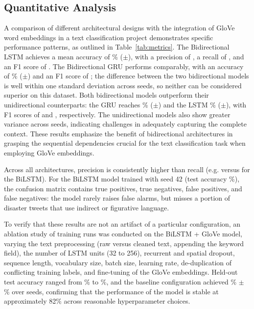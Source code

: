 \documentclass[conference]{IEEEtran}
\begin{document}
\subsection{Quantitative Analysis}
A comparison of different architectural designs with the integration of GloVe word embeddings in a text classification project demonstrates specific performance patterns, as outlined in Table~\ref{tab:metrics}. The Bidirectional LSTM achieves a mean accuracy of \accBilstm\% ($\pm$\accsdBilstm), with a precision of \precBilstm, a recall of \recBilstm, and an F1 score of \foneBilstm. The Bidirectional GRU performs comparably, with an accuracy of \accBigru\% ($\pm$\accsdBigru) and an F1 score of \foneBigru; the difference between the two bidirectional models is well within one standard deviation across seeds, so neither can be considered superior on this dataset. Both bidirectional models outperform their unidirectional counterparts: the GRU reaches \accGru\% ($\pm$\accsdGru) and the LSTM \accLstm\% ($\pm$\accsdLstm), with F1 scores of \foneGru{} and \foneLstm{}, respectively. The unidirectional models also show greater variance across seeds, indicating challenges in adequately capturing the complete context. These results emphasize the benefit of bidirectional architectures in grasping the sequential dependencies crucial for the text classification task when employing GloVe embeddings.



Across all architectures, precision is consistently higher than recall (e.g. \precBilstm{} versus \recBilstm{} for the BiLSTM). For the BiLSTM model trained with seed 42 (test accuracy \mainAcc\%), the confusion matrix contains \cmTP{} true positives, \cmTN{} true negatives, \cmFP{} false positives, and \cmFN{} false negatives: the model rarely raises false alarms, but misses a portion of disaster tweets that use indirect or figurative language.

To verify that these results are not an artifact of a particular configuration, an ablation study of \ablN{} training runs was conducted on the BiLSTM + GloVe model, varying the text preprocessing (raw versus cleaned text, appending the keyword field), the number of LSTM units (32 to 256), recurrent and spatial dropout, sequence length, vocabulary size, batch size, learning rate, de-duplication of conflicting training labels, and fine-tuning of the GloVe embeddings. Held-out test accuracy ranged from \ablMin\% to \ablMax\%, and the baseline configuration achieved \ablBaseMean\% $\pm$ \ablBaseSd\% over \ablBaseN{} seeds, confirming that the performance of the model is stable at approximately 82\% across reasonable hyperparameter choices.
\end{document}
